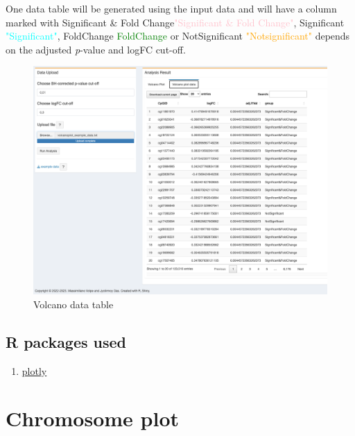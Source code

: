 \documentclass[
  a4paper,
  oneside,
  open=any]{scrreport}
\providecommand{\tightlist}{%
  \setlength{\itemsep}{0pt}\setlength{\parskip}{0pt}}\usepackage{longtable,booktabs,array}
\begin{document}
One data table will be generated using the input data and will have a
column marked with {Significant \& Fold
Change}\textcolor{pink}{"Significant \& Fold Change"}, {Significant}
\textcolor{cyan}{"Significant"}, {FoldChange}
\textcolor{green}{FoldChange} or {NotSignificant}
\textcolor{orange}{"Notsignificant"} depends on the adjusted
\emph{p}-value and logFC cut-off.\\

\begin{figure}[H]

{\centering \includegraphics{./_images/Volcano2.png}

}

\caption{Volcano data table}

\end{figure}

\hypertarget{r-packages-used-3}{%
\section{R packages used}\label{r-packages-used-3}}

\begin{enumerate}
\def\labelenumi{\arabic{enumi}.}
\tightlist
\item
  \href{https://cran.r-project.org/web/packages/plotly/plotly.pdf}{plotly}
\end{enumerate}

\hypertarget{sec-chromosome}{%
\chapter{Chromosome plot}\label{sec-chromosome}}
\end{document}
